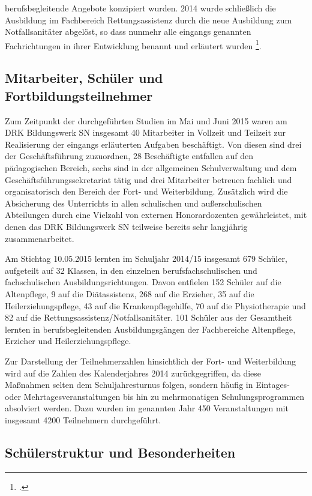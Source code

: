 berufsbegleitende Angebote konzipiert wurden. 2014 wurde schließlich die Ausbildung im Fachbereich Rettungsassistenz durch die neue Ausbildung zum Notfallsanitäter abgelöst, so dass nunmehr alle eingangs genannten Fachrichtungen in ihrer Entwicklung benannt und erläutert wurden \footcite[vgl.]{DRKBS2015}.

\subsection{Mitarbeiter, Schüler und Fortbildungsteilnehmer}
\label{sec:MitarbeiterSchülerUndFortbildungsteilnehmer}

Zum Zeitpunkt der durchgeführten Studien im Mai und Juni 2015 waren am DRK Bildungswerk SN insgesamt 40 Mitarbeiter in Vollzeit und Teilzeit zur Realisierung der eingangs erläuterten Aufgaben beschäftigt. Von diesen sind drei der Geschäftsführung zuzuordnen, 28 Beschäftigte entfallen auf den pädagogischen Bereich, sechs sind in der allgemeinen Schulverwaltung und dem Geschäftsführungssekretariat tätig und drei Mitarbeiter betreuen fachlich und organisatorisch den Bereich der Fort- und Weiterbildung. Zusätzlich wird die Absicherung des Unterrichts in allen schulischen und außerschulischen Abteilungen durch eine Vielzahl von externen Honorardozenten gewährleistet, mit denen das DRK Bildungswerk SN teilweise bereits sehr langjährig zusammenarbeitet. 

Am Stichtag 10.05.2015 lernten im Schuljahr 2014/15 insgesamt 679 Schüler, aufgeteilt auf 32 Klassen, in den einzelnen berufsfachschulischen und fachschulischen Ausbildungsrichtungen. Davon entfielen 152 Schüler auf die Altenpflege, 9 auf die Diätassistenz, 268 auf die Erzieher, 35 auf die Heilerziehungspflege, 43 auf die Krankenpflegehilfe, 70 auf die Physiotherapie und 82 auf die Rettungsassistenz/Notfallsanitäter. 101 Schüler aus der Gesamtheit lernten in berufsbegleitenden Ausbildungsgängen der Fachbereiche Altenpflege, Erzieher und Heilerziehungspflege. 

Zur Darstellung der Teilnehmerzahlen hinsichtlich der Fort- und Weiterbildung wird auf die Zahlen des Kalenderjahres 2014 zurückgegriffen, da diese Maßnahmen selten dem Schuljahresturnus folgen, sondern häufig in Eintages- oder Mehrtagesveranstaltungen bis hin zu mehrmonatigen Schulungsprogrammen absolviert werden. Dazu wurden im genannten Jahr 450 Veranstaltungen mit insgesamt 4200 Teilnehmern durchgeführt.

\subsection{Schülerstruktur und Besonderheiten}
\label{sec:SchülerstrukturUndBesonderheiten}

